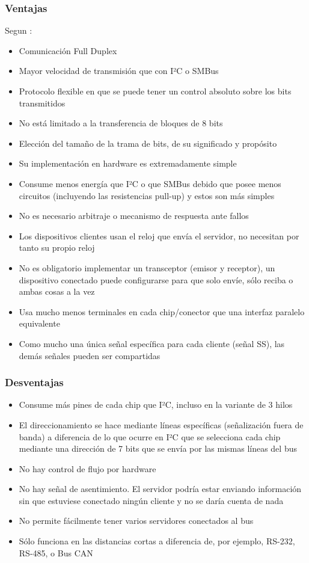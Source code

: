 \documentclass[../informe_krapp.tex]{subfiles}
\begin{document}
\subsubsection{Ventajas}
Segun \cite{wikipedia_spi}:
\begin{itemize}
	\item Comunicación Full Duplex
	\item Mayor velocidad de transmisión que con I²C o SMBus
	\item Protocolo flexible en que se puede tener un control absoluto sobre los bits transmitidos
	\item No está limitado a la transferencia de bloques de 8 bits
	\item Elección del tamaño de la trama de bits, de su significado y propósito
	\item Su implementación en hardware es extremadamente simple
	\item Consume menos energía que I²C o que SMBus debido que posee menos circuitos (incluyendo las resistencias pull-up) y estos son más simples
	\item No es necesario arbitraje o mecanismo de respuesta ante fallos
	\item Los dispositivos clientes usan el reloj que envía el servidor, no necesitan por tanto su propio reloj
	\item No es obligatorio implementar un transceptor (emisor y receptor), un dispositivo conectado puede configurarse para que solo envíe, sólo reciba o ambas cosas a la vez
	\item Usa mucho menos terminales en cada chip/conector que una interfaz paralelo equivalente
	\item Como mucho una única señal específica para cada cliente (señal SS), las demás señales pueden ser compartidas
\end{itemize}

\subsubsection{Desventajas}
\begin{itemize}
	\item Consume más pines de cada chip que I²C, incluso en la variante de 3 hilos
	\item El direccionamiento se hace mediante líneas específicas (señalización fuera de banda) a diferencia de lo que ocurre en I²C que se selecciona cada chip mediante una dirección de 7 bits que se envía por las mismas líneas del bus
	\item No hay control de flujo por hardware
	\item No hay señal de asentimiento. El servidor podría estar enviando información sin que estuviese conectado ningún cliente y no se daría cuenta de nada
	\item No permite fácilmente tener varios servidores conectados al bus
	\item Sólo funciona en las distancias cortas a diferencia de, por ejemplo, RS-232, RS-485, o Bus CAN
\end{itemize}
\end{document}
